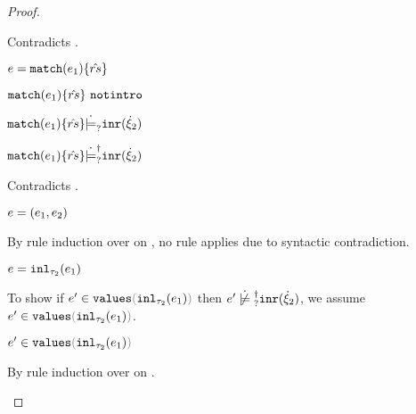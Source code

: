 \begin{proof}
\begin{byCases}
\begin{byCases}
\begin{byCases}
          Contradicts . 
        \item[\text{(\ref{rule:IMatch})}]
          \begin{pfsteps*}
          \item $e=\mathtt{match}(e_1) \{\hat{rs}\}$ 
          \item $\mathtt{match}(e_1) \{\hat{rs}\} ~\mathtt{notintro}$ 
          \item $\mathtt{match}(e_1) \{\hat{rs}\} \dot{\models}_{?} \mathtt{inr}(\dot{\xi}_2)$
             
          \item $\mathtt{match}(e_1) \{\hat{rs}\} \dot{\models}_{?}^{\dag} \mathtt{inr}(\dot{\xi}_2)$
          \end{pfsteps*}
          Contradicts . 
        \item[\text{(\ref{rule:IPairL}), (\ref{rule:IPairR}),
            (\ref{rule:IPair})}]
          \begin{pfsteps*}
          \item $e=(e_1 , e_2)$ 
          \end{pfsteps*}
          By rule induction over  on , no
          rule applies due to syntactic contradiction. 
        \item[\text{(\ref{rule:IInl})}]
          \begin{pfsteps*}
          \item $e=\mathtt{inl}_{\tau_2}({e_1})$ 
          \end{pfsteps*}
          To show if $\inValues{e'}{\hinl{\tau_2}{e_1}}$ then
          $\cnotsatisfyormay{e'}{\cinr{\hxi_2}}$, we assume
          $\inValues{e'}{\hinl{\tau_2}{e_1}}$.
          \begin{pfsteps*}
          \item $\inValues{e'}{\hinl{\tau_2}{e_1}}$ 
          \end{pfsteps*}
          By rule induction over  on
          .
          \begin{byCases}
          \item[\text{(\ref{rule:IVVal})}]
            \begin{pfsteps*}

\end{pfsteps*}
\end{byCases}
\end{byCases}
\end{byCases}
\end{byCases}
\end{proof}
